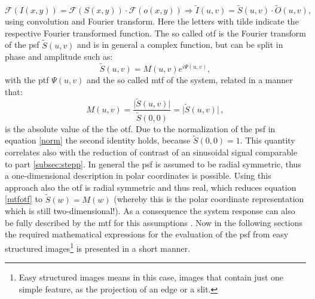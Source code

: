 \begin{equation}
\mathcal{F}(I(x,y)) = \mathcal{F}(S(x,y))\cdot \mathcal{F}(o(x,y)) \Rightarrow \tilde{I}(u,v) = \tilde{S}(u,v)\cdot \tilde{O}(u,v), 
\end{equation}
using convolution and Fourier transform. Here the letters with tilde indicate the respective Fourier transformed function. The so called \gls{otf} is the Fourier transform of the \acrlong{psf} $\tilde{S}(u,v)$ and is in general a complex function, but can be split in phase and amplitude such as:
\begin{equation}\label{mtfotf}
\tilde{S}(u,v) = M(u,v)e^{i\Psi(u,v)},
\end{equation}
with the \gls{ptf} $\Psi(u,v)$ and the so called \acrlong{mtf} of the system, related in a manner that:
\begin{equation}
M(u,v) = \frac{\lvert \tilde{S}(u,v)\rvert}{\tilde{S}(0,0)} = \lvert \tilde{S}(u,v) \rvert\, ,
\end{equation}
is the absolute value of the the \gls{otf}. Due to the normalization of the \gls{psf} in equation \ref{norm} the second identity holds, because $\tilde{S}(0,0) = 1$. This quantity correlates also with the reduction of contrast of an sinusoidal signal comparable to part \ref{subsec:stepp}. In general the \gls{psf} is assumed to be radial symmetric, thus a one-dimensional description in polar coordinates is possible. Using this approach also the \gls{otf} is radial symmetric and thus real, which reduces equation \ref{mtfotf} to $\tilde{S}(w) = M(w)$ (whereby this is the polar coordinate representation which is still two-dimensional!). As a consequence the system response can also be fully described by the \gls{mtf} for this assumptions \citep{Donath2007}. Now in the following sections the required mathematical expressions for the evaluation of the \gls{psf} from easy structured images\footnote{Easy structured images means in this case, images that contain just one simple feature, as the projection of an edge or a slit.} is presented in a short manner. 
